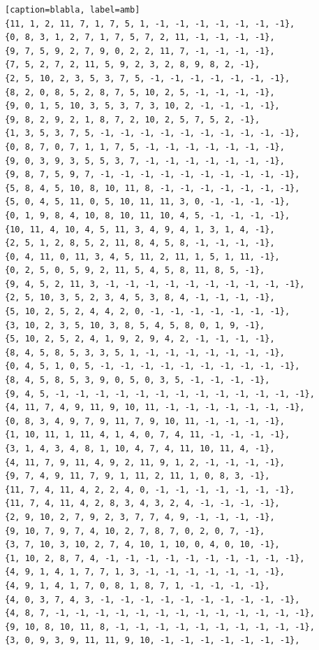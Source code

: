 \documentclass[12pt]{article}
\begin{document}
\begin{lstlisting}[frame=single][caption=blabla, label=amb]
{11, 1, 2, 11, 7, 1, 7, 5, 1, -1, -1, -1, -1, -1, -1, -1},
{0, 8, 3, 1, 2, 7, 1, 7, 5, 7, 2, 11, -1, -1, -1, -1},
{9, 7, 5, 9, 2, 7, 9, 0, 2, 2, 11, 7, -1, -1, -1, -1},
{7, 5, 2, 7, 2, 11, 5, 9, 2, 3, 2, 8, 9, 8, 2, -1},
{2, 5, 10, 2, 3, 5, 3, 7, 5, -1, -1, -1, -1, -1, -1, -1},
{8, 2, 0, 8, 5, 2, 8, 7, 5, 10, 2, 5, -1, -1, -1, -1},
{9, 0, 1, 5, 10, 3, 5, 3, 7, 3, 10, 2, -1, -1, -1, -1},
{9, 8, 2, 9, 2, 1, 8, 7, 2, 10, 2, 5, 7, 5, 2, -1},
{1, 3, 5, 3, 7, 5, -1, -1, -1, -1, -1, -1, -1, -1, -1, -1},
{0, 8, 7, 0, 7, 1, 1, 7, 5, -1, -1, -1, -1, -1, -1, -1},
{9, 0, 3, 9, 3, 5, 5, 3, 7, -1, -1, -1, -1, -1, -1, -1},
{9, 8, 7, 5, 9, 7, -1, -1, -1, -1, -1, -1, -1, -1, -1, -1},
{5, 8, 4, 5, 10, 8, 10, 11, 8, -1, -1, -1, -1, -1, -1, -1},
{5, 0, 4, 5, 11, 0, 5, 10, 11, 11, 3, 0, -1, -1, -1, -1},
{0, 1, 9, 8, 4, 10, 8, 10, 11, 10, 4, 5, -1, -1, -1, -1},
{10, 11, 4, 10, 4, 5, 11, 3, 4, 9, 4, 1, 3, 1, 4, -1},
{2, 5, 1, 2, 8, 5, 2, 11, 8, 4, 5, 8, -1, -1, -1, -1},
{0, 4, 11, 0, 11, 3, 4, 5, 11, 2, 11, 1, 5, 1, 11, -1},
{0, 2, 5, 0, 5, 9, 2, 11, 5, 4, 5, 8, 11, 8, 5, -1},
{9, 4, 5, 2, 11, 3, -1, -1, -1, -1, -1, -1, -1, -1, -1, -1},
{2, 5, 10, 3, 5, 2, 3, 4, 5, 3, 8, 4, -1, -1, -1, -1},
{5, 10, 2, 5, 2, 4, 4, 2, 0, -1, -1, -1, -1, -1, -1, -1},
{3, 10, 2, 3, 5, 10, 3, 8, 5, 4, 5, 8, 0, 1, 9, -1},
{5, 10, 2, 5, 2, 4, 1, 9, 2, 9, 4, 2, -1, -1, -1, -1},
{8, 4, 5, 8, 5, 3, 3, 5, 1, -1, -1, -1, -1, -1, -1, -1},
{0, 4, 5, 1, 0, 5, -1, -1, -1, -1, -1, -1, -1, -1, -1, -1},
{8, 4, 5, 8, 5, 3, 9, 0, 5, 0, 3, 5, -1, -1, -1, -1},
{9, 4, 5, -1, -1, -1, -1, -1, -1, -1, -1, -1, -1, -1, -1, -1},
{4, 11, 7, 4, 9, 11, 9, 10, 11, -1, -1, -1, -1, -1, -1, -1},
{0, 8, 3, 4, 9, 7, 9, 11, 7, 9, 10, 11, -1, -1, -1, -1},
{1, 10, 11, 1, 11, 4, 1, 4, 0, 7, 4, 11, -1, -1, -1, -1},
{3, 1, 4, 3, 4, 8, 1, 10, 4, 7, 4, 11, 10, 11, 4, -1},
{4, 11, 7, 9, 11, 4, 9, 2, 11, 9, 1, 2, -1, -1, -1, -1},
{9, 7, 4, 9, 11, 7, 9, 1, 11, 2, 11, 1, 0, 8, 3, -1},
{11, 7, 4, 11, 4, 2, 2, 4, 0, -1, -1, -1, -1, -1, -1, -1},
{11, 7, 4, 11, 4, 2, 8, 3, 4, 3, 2, 4, -1, -1, -1, -1},
{2, 9, 10, 2, 7, 9, 2, 3, 7, 7, 4, 9, -1, -1, -1, -1},
{9, 10, 7, 9, 7, 4, 10, 2, 7, 8, 7, 0, 2, 0, 7, -1},
{3, 7, 10, 3, 10, 2, 7, 4, 10, 1, 10, 0, 4, 0, 10, -1},
{1, 10, 2, 8, 7, 4, -1, -1, -1, -1, -1, -1, -1, -1, -1, -1},
{4, 9, 1, 4, 1, 7, 7, 1, 3, -1, -1, -1, -1, -1, -1, -1},
{4, 9, 1, 4, 1, 7, 0, 8, 1, 8, 7, 1, -1, -1, -1, -1},
{4, 0, 3, 7, 4, 3, -1, -1, -1, -1, -1, -1, -1, -1, -1, -1},
{4, 8, 7, -1, -1, -1, -1, -1, -1, -1, -1, -1, -1, -1, -1, -1},
{9, 10, 8, 10, 11, 8, -1, -1, -1, -1, -1, -1, -1, -1, -1, -1},
{3, 0, 9, 3, 9, 11, 11, 9, 10, -1, -1, -1, -1, -1, -1, -1},

\end{lstlisting}
\end{document}
